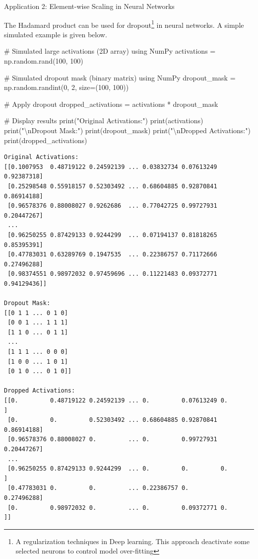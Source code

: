 \documentclass[
  letterpaper,
  DIV=11,
  numbers=noendperiod]{scrreprt}
\newenvironment{Shaded}{\begin{snugshade}}{\end{snugshade}}
\newcommand{\BuiltInTok}[1]{\textcolor[rgb]{0.00,0.23,0.31}{#1}}
\newcommand{\CharTok}[1]{\textcolor[rgb]{0.13,0.47,0.30}{#1}}
\newcommand{\CommentTok}[1]{\textcolor[rgb]{0.37,0.37,0.37}{#1}}
\newcommand{\DecValTok}[1]{\textcolor[rgb]{0.68,0.00,0.00}{#1}}
\newcommand{\NormalTok}[1]{\textcolor[rgb]{0.00,0.23,0.31}{#1}}
\newcommand{\OperatorTok}[1]{\textcolor[rgb]{0.37,0.37,0.37}{#1}}
\newcommand{\StringTok}[1]{\textcolor[rgb]{0.13,0.47,0.30}{#1}}
\theoremstyle{plain}
\theoremstyle{definition}
\theoremstyle{remark}
\begin{document}
Application 2: Element-wise Scaling in Neural Networks

The Hadamard product can be used for dropout\footnote{A regularization
  techniques in Deep learning. This approach deactivate some selected
  neurons to control model over-fitting} in neural networks. A simple
simulated example is given below.

\begin{Shaded}
\begin{Highlighting}[]
\CommentTok{\# Simulated large activations (2D array) using NumPy}
\NormalTok{activations }\OperatorTok{=}\NormalTok{ np.random.rand(}\DecValTok{100}\NormalTok{, }\DecValTok{100}\NormalTok{)}

\CommentTok{\# Simulated dropout mask (binary matrix) using NumPy}
\NormalTok{dropout\_mask }\OperatorTok{=}\NormalTok{ np.random.randint(}\DecValTok{0}\NormalTok{, }\DecValTok{2}\NormalTok{, size}\OperatorTok{=}\NormalTok{(}\DecValTok{100}\NormalTok{, }\DecValTok{100}\NormalTok{))}

\CommentTok{\# Apply dropout}
\NormalTok{dropped\_activations }\OperatorTok{=}\NormalTok{ activations }\OperatorTok{*}\NormalTok{ dropout\_mask}

\CommentTok{\# Display results}
\BuiltInTok{print}\NormalTok{(}\StringTok{"Original Activations:"}\NormalTok{)}
\BuiltInTok{print}\NormalTok{(activations)}
\BuiltInTok{print}\NormalTok{(}\StringTok{"}\CharTok{\textbackslash{}n}\StringTok{Dropout Mask:"}\NormalTok{)}
\BuiltInTok{print}\NormalTok{(dropout\_mask)}
\BuiltInTok{print}\NormalTok{(}\StringTok{"}\CharTok{\textbackslash{}n}\StringTok{Dropped Activations:"}\NormalTok{)}
\BuiltInTok{print}\NormalTok{(dropped\_activations)}
\end{Highlighting}
\end{Shaded}

\begin{verbatim}
Original Activations:
[[0.1007953  0.48719122 0.24592139 ... 0.03832734 0.07613249 0.92387318]
 [0.25298548 0.55918157 0.52303492 ... 0.68604885 0.92870841 0.86914188]
 [0.96578376 0.88008027 0.9262686  ... 0.77042725 0.99727931 0.20447267]
 ...
 [0.96250255 0.87429133 0.9244299  ... 0.07194137 0.81818265 0.85395391]
 [0.47783031 0.63289769 0.1947535  ... 0.22386757 0.71172666 0.27496288]
 [0.98374551 0.98972032 0.97459696 ... 0.11221483 0.09372771 0.94129436]]

Dropout Mask:
[[0 1 1 ... 0 1 0]
 [0 0 1 ... 1 1 1]
 [1 1 0 ... 0 1 1]
 ...
 [1 1 1 ... 0 0 0]
 [1 0 0 ... 1 0 1]
 [0 1 0 ... 0 1 0]]

Dropped Activations:
[[0.         0.48719122 0.24592139 ... 0.         0.07613249 0.        ]
 [0.         0.         0.52303492 ... 0.68604885 0.92870841 0.86914188]
 [0.96578376 0.88008027 0.         ... 0.         0.99727931 0.20447267]
 ...
 [0.96250255 0.87429133 0.9244299  ... 0.         0.         0.        ]
 [0.47783031 0.         0.         ... 0.22386757 0.         0.27496288]
 [0.         0.98972032 0.         ... 0.         0.09372771 0.        ]]
\end{verbatim}
\end{document}
